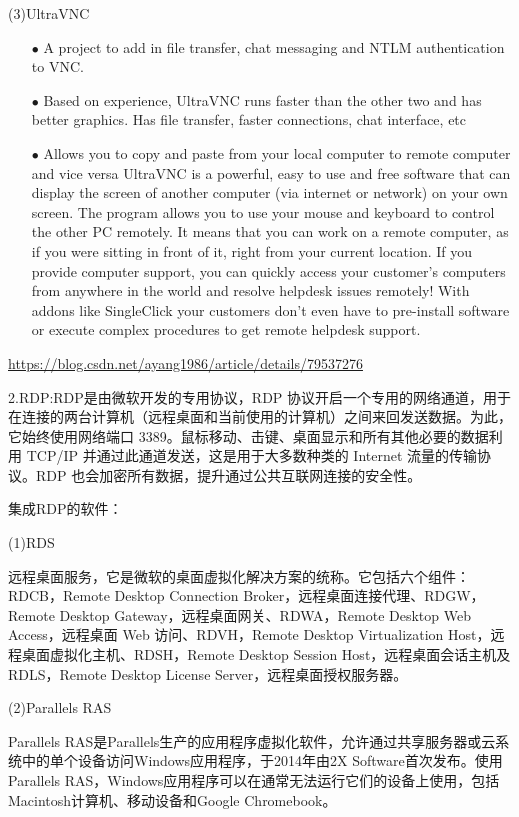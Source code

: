 \documentclass[a4paper,twoside]{scrbook}
\begin{document}
\begin{CJK}{UTF8}{gbsn}
(3)UltraVNC
\begin{itemize}
\item[$\bullet$]A project to add in file transfer, chat messaging and NTLM authentication to VNC.
\item[$\bullet$]Based on experience, UltraVNC runs faster than the other two and has better graphics.
Has file transfer, faster connections, chat interface, etc
\item[$\bullet$]Allows you to copy and paste from your local computer to remote computer and vice versa
UltraVNC is a powerful, easy to use and free software that can display the screen of another computer (via internet or network) on your own screen. The program allows you to use your mouse and keyboard to control the other PC remotely. It means that you can work on a remote computer, as if you were sitting in front of it, right from your current location. If you provide computer support, you can quickly access your customer’s computers from anywhere in the world and resolve helpdesk issues remotely! With addons like SingleClick your customers don’t even have to pre-install software or execute complex procedures to get remote helpdesk support.
\end{itemize}

\url{https://blog.csdn.net/ayang1986/article/details/79537276}

2.RDP:RDP是由微软开发的专用协议，RDP 协议开启一个专用的网络通道，用于在连接的两台计算机（远程桌面和当前使用的计算机）之间来回发送数据。为此，它始终使用网络端口 3389。鼠标移动、击键、桌面显示和所有其他必要的数据利用 TCP/IP 并通过此通道发送，这是用于大多数种类的 Internet 流量的传输协议。RDP 也会加密所有数据，提升通过公共互联网连接的安全性。

集成RDP的软件：

(1)RDS

远程桌面服务，它是微软的桌面虚拟化解决方案的统称。它包括六个组件：RDCB，Remote Desktop Connection Broker，远程桌面连接代理、RDGW，Remote Desktop Gateway，远程桌面网关、RDWA，Remote Desktop Web Access，远程桌面 Web 访问、RDVH，Remote Desktop Virtualization Host，远程桌面虚拟化主机、RDSH，Remote Desktop Session Host，远程桌面会话主机及RDLS，Remote Desktop License Server，远程桌面授权服务器。

(2)Parallels RAS

Parallels RAS是Parallels生产的应用程序虚拟化软件，允许通过共享服务器或云系统中的单个设备访问Windows应用程序，于2014年由2X Software首次发布。使用Parallels RAS，Windows应用程序可以在通常无法运行它们的设备上使用，包括Macintosh计算机、移动设备和Google Chromebook。


\end{CJK}
\end{document}
